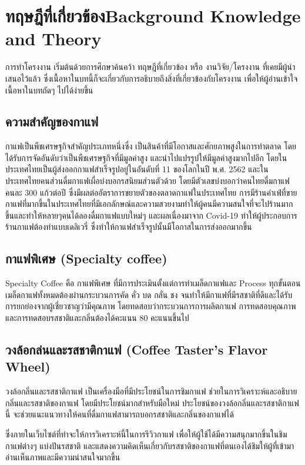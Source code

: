 \chapter{\ifcpe ทฤษฎีที่เกี่ยวข้อง\else Background Knowledge and Theory\fi}

การทำโครงงาน เริ่มต้นด้วยการศึกษาค้นคว้า ทฤษฎีที่เกี่ยวข้อง หรือ งานวิจัย/โครงงาน ที่เคยมีผู้นำเสนอไว้แล้ว ซึ่งเนื้อหาในบทนี้ก็จะเกี่ยวกับการอธิบายถึงสิ่งที่เกี่ยวข้องกับโครงงาน เพื่อให้ผู้อ่านเข้าใจเนื้อหาในบทถัดๆ ไปได้ง่ายขึ้น

\section{ความสำคัญของกาแฟ}
กาแฟเป็นพืชเศรษฐกิจสำคัญประเภทหนึ่งซึ่ง เป็นสินค้าที่มีโอกาสและศักยภาพสูงในการทำตลาด โดยได้รับการจัดอันดับว่าเป็นพืชเศรษฐกิจที่มีมูลค่าสูง และนำไปแปรรูปให้มีมูลค่าสูงมากไปอีก โดยในประเทศไทยเป็นผู้ส่งออกกาแฟสำเร็จรูปอยู่ในอันดับที่ 11 ของโลกในปี พ.ศ. 2562 และในประเทศไทยคนส่วนดื่มกาแฟเผื่อบ่งบอกรสนิยมส่วนตัวด้วย โดยมีตัวเลขบ่งบอกว่าคนไทยดื่มกาแฟคนละ 300 แก้วต่อปี ซึ่งมีผลต่ออัตราการขยายตัวของตลาดกาแฟในประเทศไทย การมีร้านค่าเฟ่ที่ขายกาแฟที่มากขึ้นในประเทศไทยที่มีเอกลักษณ์และความสวยงามทำให้ผู้คนมีความสนใจที่จะไปร้านมากขึ้นและทำให้หลายๆคนได้ลองดื่มกาแฟแบบใหม่ๆ และผลเนื่องมาจาก Covid-19 ทำให้ผู้ประกอบการร้านกาแฟต้องทำแบบเดลิเวรี่ ซึ่งทำให้กาแฟสำเร็จรูปนั้นมีโอกาสในการส่งออกมากขึ้น \cite{growth}

\section{กาแฟพิเศษ (Specialty coffee)}
Specialty Coffee คือ กาแฟพิเศษ ที่มีการประเมินตั้งแต่การทำเมล็ดกาแฟและ Process ทุกขั้นตอน เมล็ดกาแฟทั้งหมดต้องผ่านกระบวนการคัด คั่ว บด กลั่น ชง จนทำให้มีกาแฟที่มีรสชาติที่ดีและได้รับการยกย่องจากผู้เชี่ยวชาญว่ามีคุณภาพ โดยทดสอบว่ากระบวนการการผลิตกาแฟ การทดสอบคุณภาพ และการทดสอบรสชาติและกลิ่นต้องได้คะแนน 80 คะแนนขึ้นไป \cite{special}

\section{วงล้อกล่นและรสชาติกาแฟ (Coffee Taster's Flavor Wheel)}
วงล้อกลิ่นและรสชาติกาแฟ เป็นเครื่องมือที่มีประโยชน์ในการชิมกาแฟ ช่วยในการวิเคราะห์และอธิบายกลิ่นและรสชาติของกาแฟ โดยมีประโยชน์มากสำหรับมือใหม่ ประโยชน์ของวงล้อกลิ่นและรสชาติกาแฟนี้ จะช่วยแนะแนวทางให้คนที่ดื่มกาแฟสามารถบอกรสชาติและกลิ่นของกาแฟได้\cite{wheel}

ซึ่งภายในเว็บไซต์ที่ทำจะให้การวิเคราะห์นี้ในการรีวิวกาแฟ เพื่อให้ผู้ใช้ได้มีความสนุกมากขึ้นในชิมกาแฟต่างๆ แบ่งปันรสชาติ และแสดงความคิดเห็นเกี่ยวกับรสชาติของกาแฟที่ตนเองได้ชิมให้ผู้ที่เข้ามาอ่านเห็นภาพและมีความน่าสนใจมากขึ้น

